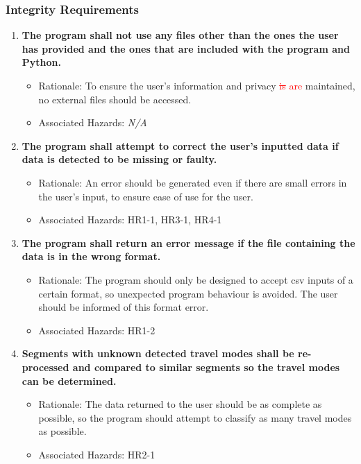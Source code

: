 \documentclass{article}
\begin{document}
\subsubsection{Integrity Requirements}
\begin{enumerate}[{IR}1. ]
\item \label{IR1} \textbf{The program shall not use any files other than the ones the user has provided and the ones that are included with the program and Python.}
    \begin{itemize} 
        \item Rationale: To ensure the user's information and privacy \textcolor{red}{\sout{is} are} maintained, no external files should be accessed.
         \item Associated Hazards: \textit{N/A}
    \end{itemize}
\item \label{IR2} \textbf{The program shall attempt to correct the user's inputted data if data is detected to be missing or faulty.}
    \begin{itemize} 
        \item Rationale: An error should be generated even if there are small errors in the user's input, to ensure ease of use for the user.
         \item Associated Hazards: HR1-1, HR3-1, HR4-1
    \end{itemize} 
\item \label{IR3} \textbf{The program shall return an error message if the file containing the data is in the wrong format.}
    \begin{itemize} 
        \item Rationale: The program should only be designed to accept csv inputs of a certain format, so unexpected program behaviour is avoided. The user should be informed of this format error.
         \item Associated Hazards: HR1-2
    \end{itemize} 
\item \label{IR4} \textbf{Segments with unknown detected travel modes shall be re-processed and compared to similar segments so the travel modes can be determined.}
    \begin{itemize} 
        \item Rationale: The data returned to the user should be as complete as possible, so the program should attempt to classify as many travel modes as possible.
         \item Associated Hazards: HR2-1
    \end{itemize} 

\end{enumerate}
\end{document}
